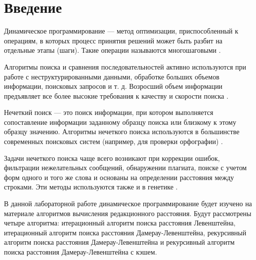 {\center\chapter*{Введение}}

Динамическое программирование --- метод оптимизации, приспособленный к операциям, в которых процесс принятия решений может быть разбит на отдельные этапы (шаги). 
Такие операции называются многошаговыми \cite{Voytenko1979}.

Алгоритмы поиска и сравнения последовательностей активно используются при работе с неструктурированными данными, обработке больших объемов информации, поисковых запросов и т. д. 
Возросший объем информации предъявляет все более высокие требования к качеству и скорости поиска \cite{Prytkov2012}.

Нечеткий поиск --- это поиск информации, при котором выполняется сопоставление информации заданному образцу поиска или близкому к этому образцу значению. 
Алгоритмы нечеткого поиска используются в большинстве современных поисковых систем (например, для проверки орфографии) \cite{Mosalev2013}.

Задачи нечеткого поиска чаще всего возникают при коррекции ошибок, фильтрации нежелательных сообщений, обнаружении плагиата, поиске с учетом форм одного и того же слова и основаны на определении расстояния между строками. 
Эти методы используются также и в генетике \cite{Prytkov2012}.

В данной лабораторной работе динамическое программирование будет изучено на материале алгоритмов вычисления редакционного расстояния. 
Будут рассмотрены четыре алгоритма: итерационный алгоритм поиска расстояния Левенштейна, итерационный алгоритм поиска расстояния Дамерау-Левенштейна, рекурсивный алгоритм поиска расстояния Дамерау-Левенштейна и рекурсивный алгоритм поиска расстояния Дамерау-Левенштейна с кэшем.
